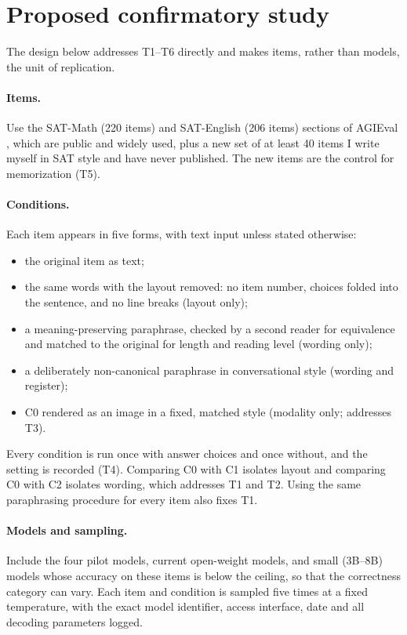 \documentclass[11pt]{article}
\begin{document}
\section{Proposed confirmatory study}
\label{sec:protocol}

The design below addresses T1--T6 directly and makes items, rather than models, the unit of replication.

\paragraph{Items.} Use the SAT-Math (220 items) and SAT-English (206 items) sections of AGIEval \citep{zhong2023agieval}, which are public and widely used, plus a new set of at least 40 items I write myself in SAT style and have never published. The new items are the control for memorization (T5).

\paragraph{Conditions.} Each item appears in five forms, with text input unless stated otherwise:
\begin{itemize}
  \item[C0] the original item as text;
  \item[C1] the same words with the layout removed: no item number, choices folded into the sentence, and no line breaks (layout only);
  \item[C2] a meaning-preserving paraphrase, checked by a second reader for equivalence and matched to the original for length and reading level (wording only);
  \item[C3] a deliberately non-canonical paraphrase in conversational style (wording and register);
  \item[C4] C0 rendered as an image in a fixed, matched style (modality only; addresses T3).
\end{itemize}
Every condition is run once with answer choices and once without, and the setting is recorded (T4). Comparing C0 with C1 isolates layout and comparing C0 with C2 isolates wording, which addresses T1 and T2. Using the same paraphrasing procedure for every item also fixes T1.

\paragraph{Models and sampling.} Include the four pilot models, current open-weight models, and small (3B--8B) models whose accuracy on these items is below the ceiling, so that the correctness category can vary. Each item and condition is sampled five times at a fixed temperature, with the exact model identifier, access interface, date and all decoding parameters logged.
\end{document}
